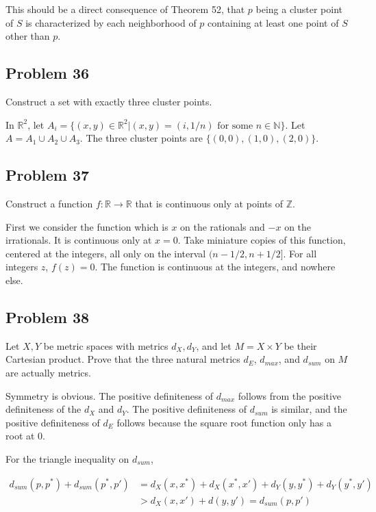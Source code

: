\documentclass{article}
\begin{document}
This should be a direct consequence of Theorem 52, that $p$ being a cluster point of $S$ is characterized by each neighborhood of $p$ containing at least one point of $S$ other than $p$.

\subsection*{Problem 36}
Construct a set with exactly three cluster points.

In $\mathbb{R}^2$, let $A_i = \{(x, y) \in \mathbb{R}^2| (x, y) = (i, 1/n) \text{ for some } n \in \mathbb{N}\}$. Let $A = A_1 \cup A_2 \cup A_3$. The three cluster points are $\{(0, 0), (1, 0), (2, 0)\}$.

\subsection*{Problem 37}

Construct a function $f: \mathbb{R} \rightarrow \mathbb{R}$ that is continuous only at points of $\mathbb{Z}$.

First we consider the function which is $x$ on the rationals and $-x$ on the irrationals. It is continuous only at $x = 0$. Take miniature copies of this function, centered at the integers, all only on the interval $(n - 1/2, n + 1/2]$. For all integers $z$, $f(z) = 0$. The function is continuous at the integers, and nowhere else.

\subsection*{Problem 38}

Let $X, Y$ be metric spaces with metrics $d_X, d_Y$, and let $M = X \times Y$ be their Cartesian product. Prove that the three natural metrics $d_E$, $d_{max}$, and $d_{sum}$ on $M$ are actually metrics.

Symmetry is obvious. The positive definiteness of $d_{max}$ follows from the positive definiteness of the $d_X$ and $d_Y$. The positive definiteness of $d_{sum}$ is similar, and the positive definiteness of $d_{E}$ follows because the square root function only has a root at 0.

For the triangle inequality on $d_{sum}$,

\begin{align*}
d_{sum}(p, p^*) + d_{sum}(p^*, p') &= d_X(x, x^*) + d_X(x^*, x') + d_Y(y, y^*) + d_Y(y^*, y') \\
&> d_X(x, x') + d(y, y') = d_{sum}(p, p')
\end{align*}
\end{document}

